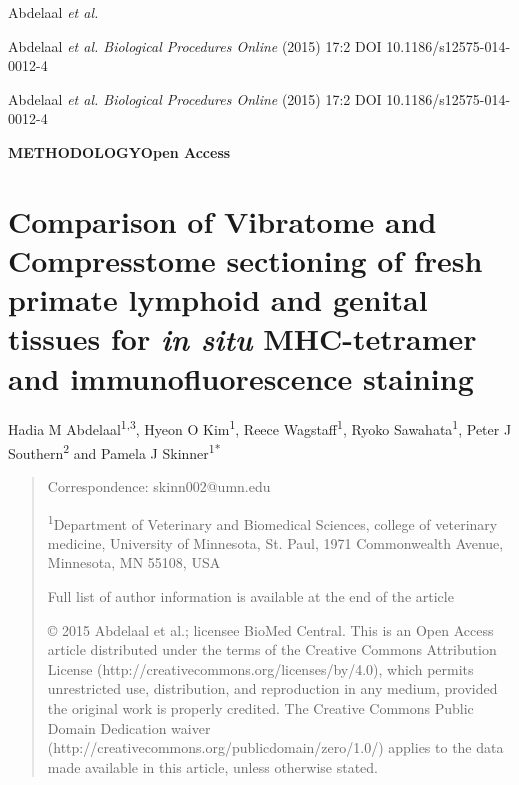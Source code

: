 \documentclass{article}
\begin{document}

\noindent Abdelaal \textit{et al.}

\noindent Abdelaal \textit{et al. Biological Procedures Online} (2015) 17:2 DOI 10.1186/s12575-014-0012-4

\noindent Abdelaal \textit{et al. Biological Procedures Online} (2015) 17:2 DOI 10.1186/s12575-014-0012-4


\noindent\textbf{METHODOLOGY}\hfill\textbf{Open Access}

\section*{Comparison of Vibratome and Compresstome sectioning of fresh primate lymphoid and genital tissues for \textit{in situ} MHC-tetramer and immunofluorescence staining}

Hadia M Abdelaal\textsuperscript{1,3}, Hyeon O Kim\textsuperscript{1}, Reece Wagstaff\textsuperscript{1}, Ryoko Sawahata\textsuperscript{1}, Peter J Southern\textsuperscript{2} and Pamela J Skinner\textsuperscript{1*}

\begin{quote}\small
\noindent * Correspondence: skinn002@umn.edu

\noindent \textsuperscript{1}Department of Veterinary and Biomedical Sciences, college of veterinary medicine, University of Minnesota, St. Paul, 1971 Commonwealth Avenue, Minnesota, MN 55108, USA

\noindent Full list of author information is available at the end of the article

\noindent © 2015 Abdelaal et al.; licensee BioMed Central. This is an Open Access article distributed under the terms of the Creative Commons Attribution License (http://creativecommons.org/licenses/by/4.0), which permits unrestricted use, distribution, and reproduction in any medium, provided the original work is properly credited. The Creative Commons Public Domain Dedication waiver (http://creativecommons.org/publicdomain/zero/1.0/) applies to the data made available in this article, unless otherwise stated.
\end{quote}
\end{document}
